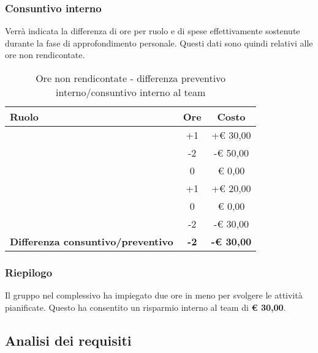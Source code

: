 		\subsubsection{Consuntivo interno} %
		\label{ssub:consuntivo}
		Verrà indicata la differenza di ore per ruolo e di spese effettivamente sostenute durante la fase di approfondimento personale. Questi dati sono quindi relativi alle ore non rendicontate.
		\begin{table}[!h]
			\begin{center}
				\begin{tabularx}{0.75\textwidth}{|X|c|c|}
					\hline
					\textbf{Ruolo} & \textbf{Ore} & \textbf{Costo} \\
					\hline
					\roleProjectManager & +1 & +\euro{} 30,00 \\
					\hline
					\roleAnalyst & -2 & -\euro{} 50,00 \\
					\hline
					\roleDesigner & 0 & \euro{} 0,00 \\
					\hline
					\roleAdministrator & +1 & +\euro{} 20,00 \\
					\hline
					\roleProgrammer & 0 & \euro{} 0,00 \\
					\hline
					\roleVerifier & -2 & -\euro{} 30,00 \\
					\hline
					\textbf{Differenza consuntivo/preventivo } & \textbf{-2} & \textbf{-\euro{} 30,00} \\
					\hline
				\end{tabularx}
			\end{center}
		\caption{Ore non rendicontate - differenza preventivo interno/consuntivo interno al team}
		\end{table}

		\subsubsection{Riepilogo} %
		\label{ssub:riepilogo}
		Il gruppo nel complessivo ha impiegato due ore in meno per svolgere le attività pianificate. \newline
		Questo ha consentito un risparmio interno al team di \textbf{\euro{} 30,00}.

	\newpage
	\subsection{Analisi dei requisiti} %
	\label{sub:analisi_dei_requisiti}
